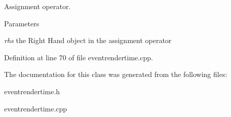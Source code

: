Assignment operator. 


\begin{DoxyParams}{Parameters}
\item[{\em rhs}]the Right Hand object in the assignment operator \end{DoxyParams}


Definition at line 70 of file eventrendertime.cpp.



The documentation for this class was generated from the following files:\begin{DoxyCompactItemize}
\item 
eventrendertime.h\item 
eventrendertime.cpp\end{DoxyCompactItemize}
